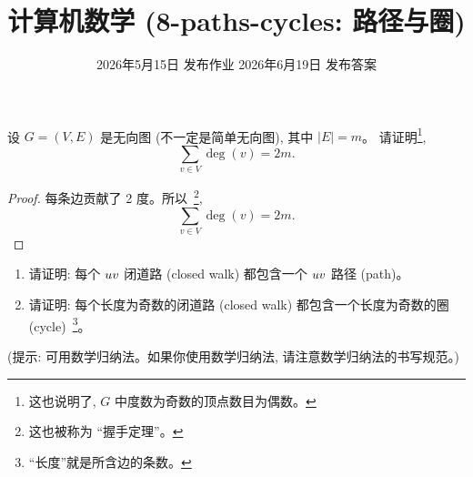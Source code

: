 \documentclass[a4paper, justified]{tufte-handout}
\title{计算机数学 (8-paths-cycles: 路径与圈)}
\date{2026年5月15日 发布作业 \qquad 2026年6月19日 发布答案}
\begin{document}
\maketitle
\noplagiarism %
\begin{abstract}
\end{abstract}
\beginrequired

\begin{problem}
  设 $G = (V, E)$ 是无向图 (不一定是简单无向图),
  其中 $|E| = m$。
  请证明\footnote{这也说明了, $G$ 中度数为奇数的顶点数目为偶数。},
  \[
    \sum_{v \in V} \deg(v) = 2m.
  \]
\end{problem}

\begin{proof}
  每条边贡献了 2 度。所以~\footnote{这也被称为 ``握手定理''。},
  \[
    \sum_{v \in V} \deg(v) = 2m.
  \]
\end{proof}

\begin{problem}
  \begin{enumerate}[(1)]
    \item 请证明: 每个 $u\-v$ 闭道路 (closed walk) 都包含一个 $u\-v$ 路径 (path)。
    \item 请证明: 每个长度为奇数的闭道路 (closed walk) 都包含一个长度为奇数的圈 (cycle)~\footnote{
    ``长度''就是所含边的条数。}。
  \end{enumerate}

  \vspace{1em}
  \noindent (提示: 可用数学归纳法。如果你使用数学归纳法, 请注意数学归纳法的书写规范。)
\end{problem}
\end{document}
